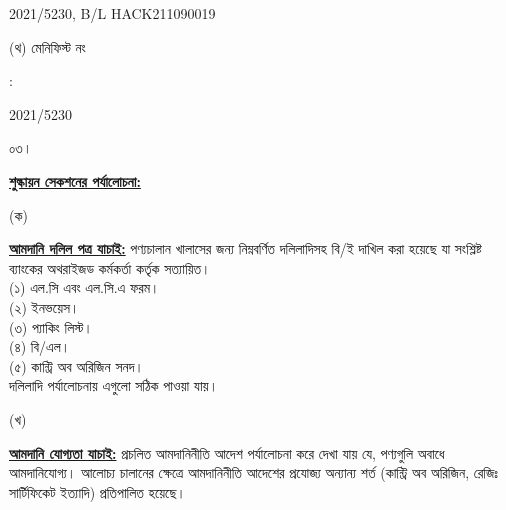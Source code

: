\documentclass[12pt]{article}
\newcommand{\blno}{HACK211090019}
\newcommand{\menifest}{2021/5230}
\begin{document}
\begin{minipage}[t]{0.50\linewidth}
{\menifest}, B/L {\blno}
\\
\end{minipage}
\begin{minipage}[t]{0.05\linewidth}
\hspace*{1em}
\end{minipage}
\begin{minipage}[t]{0.45\linewidth}
(থ) মেনিফিস্ট নং
\end{minipage}
\begin{minipage}[t]{0.02\linewidth}
:
\end{minipage}
\begin{minipage}[t]{0.50\linewidth}
{\menifest}
\\
\end{minipage}
\normalsize
\begin{minipage}[t]{0.05\linewidth}
০৩।
\end{minipage}
\begin{minipage}[t]{0.95\linewidth}
\underline{\textbf{শুল্কায়ন সেকশনের পর্যালোচনা:}}
\end{minipage}
\begin{minipage}[t]{0.05\linewidth}
\hspace{1em}
\end{minipage}
\begin{minipage}[t]{0.05\linewidth}
(ক)
\end{minipage}
\begin{minipage}[t]{0.90\linewidth}
\underline{\textbf{আমদানি দলিল পত্র যাচাই:}}
পণ্যচালান খালাসের জন্য নিম্নবর্ণিত দলিলাদিসহ বি/ই দাখিল করা
হয়েছে যা সংশ্লিষ্ট ব্যাংকের অথরাইজড কর্মকর্তা কর্তৃক সত্যায়িত।
\\
(১) এল.সি এবং এল.সি.এ ফরম।
\\
(২) ইনভয়েস।
\\
(৩) প্যাকিং লিস্ট।
\\
(৪) বি/এল।
\\
(৫) কান্ট্রি অব অরিজিন সনদ।
\\
দলিলাদি পর্যালোচনায় এগুলো
সঠিক পাওয়া যায়।
\\
\end{minipage}
\begin{minipage}[t]{0.05\linewidth}
\hspace{1em}
\end{minipage}
\begin{minipage}[t]{0.05\linewidth}
(খ)
\end{minipage}
\begin{minipage}[t]{0.90\linewidth}
\underline{\textbf{আমদানি যোগ্যতা যাচাই:}}
প্রচলিত আমদানিনীতি আদেশ পর্যালোচনা করে দেখা যায় যে, পণ্যগুলি অবাধে আমদানিযোগ্য।
আলোচ্য চালানের ক্ষেত্রে আমদানিনীতি আদেশের প্রযোজ্য অন্যান্য শর্ত (কান্ট্রি অব অরিজিন, রেজিঃ
সার্টিফিকেট ইত্যাদি) প্রতিপালিত হয়েছে।
\\
\end{minipage}
\end{document}
